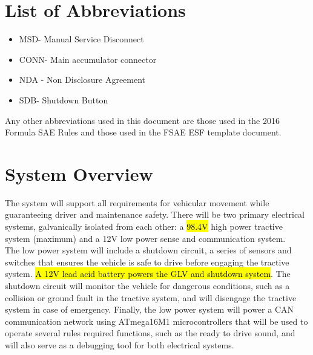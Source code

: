 \documentclass{article}
\DeclareRobustCommand{\hlr}[1]{{\sethlcolor{red}\hl{#1}}}
\begin{document}
\tableofcontents
{}

\newpage
\listoffigures
{}

\newpage
\listoftables
{}

\newpage
\section*{List of Abbreviations}
\begin{itemize}
    \item MSD- Manual Service Disconnect
    \item CONN- Main accumulator connector
    \item NDA - Non Disclosure Agreement
    \item SDB- Shutdown Button
\end{itemize}


    Any other abbreviations used in this document are those used in the 2016 Formula SAE Rules and those used in the FSAE ESF template document.

\setlength{\parindent}{0pt}

\newpage
{}


\section{System Overview} %

    The system will support all requirements for vehicular movement while guaranteeing driver and maintenance safety. There will be two primary electrical systems, galvanically isolated from each other: a \hlr{98.4V} high power tractive system (maximum) and a 12V low power sense and communication system.\\

    The low power system will include a shutdown circuit, a series of sensors and switches that ensures the vehicle is safe to drive before engaging the tractive system. \hlr{A 12V lead acid battery powers the GLV and shutdown system}. The shutdown circuit will monitor the vehicle for dangerous conditions, such as a collision or ground fault in the tractive system, and will disengage the tractive system in case of emergency. Finally, the low power system will power a CAN communication network using ATmega16M1 microcontrollers that will be used to operate several rules required functions, such as the ready to drive sound, and will also serve as a debugging tool for both electrical systems.\\
\end{document}
